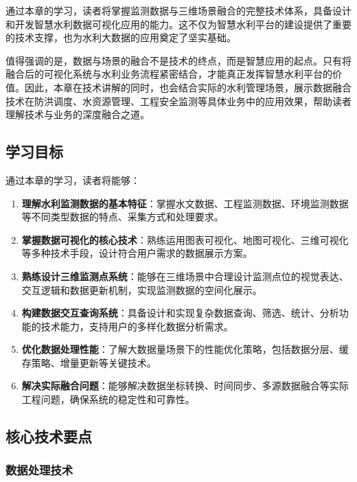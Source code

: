 通过本章的学习，读者将掌握监测数据与三维场景融合的完整技术体系，具备设计和开发智慧水利数据可视化应用的能力。这不仅为智慧水利平台的建设提供了重要的技术支撑，也为水利大数据的应用奠定了坚实基础。

值得强调的是，数据与场景的融合不是技术的终点，而是智慧应用的起点。只有将融合后的可视化系统与水利业务流程紧密结合，才能真正发挥智慧水利平台的价值。因此，本章在技术讲解的同时，也会结合实际的水利管理场景，展示数据融合技术在防洪调度、水资源管理、工程安全监测等具体业务中的应用效果，帮助读者理解技术与业务的深度融合之道。

\subsection{学习目标}\label{ux5b66ux4e60ux76eeux6807}

通过本章的学习，读者将能够：

\begin{enumerate}
\def\labelenumi{\arabic{enumi}.}
\item
  \textbf{理解水利监测数据的基本特征}：掌握水文数据、工程监测数据、环境监测数据等不同类型数据的特点、采集方式和处理要求。
\item
  \textbf{掌握数据可视化的核心技术}：熟练运用图表可视化、地图可视化、三维可视化等多种技术手段，设计符合用户需求的数据展示方案。
\item
  \textbf{熟练设计三维监测点系统}：能够在三维场景中合理设计监测点位的视觉表达、交互逻辑和数据更新机制，实现监测数据的空间化展示。
\item
  \textbf{构建数据交互查询系统}：具备设计和实现复杂数据查询、筛选、统计、分析功能的技术能力，支持用户的多样化数据分析需求。
\item
  \textbf{优化数据处理性能}：了解大数据量场景下的性能优化策略，包括数据分层、缓存策略、增量更新等关键技术。
\item
  \textbf{解决实际融合问题}：能够解决数据坐标转换、时间同步、多源数据融合等实际工程问题，确保系统的稳定性和可靠性。
\end{enumerate}

\subsection{核心技术要点}\label{ux6838ux5fc3ux6280ux672fux8981ux70b9}

\subsubsection{数据处理技术}\label{ux6570ux636eux5904ux7406ux6280ux672f}

